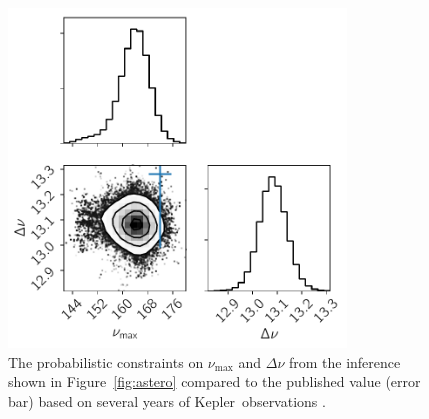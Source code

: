 \documentclass[manuscript, letterpaper]{aastex6}
\newcommand{\project}[1]{\textsf{#1}}
\newcommand{\kepler}{\project{Kepler}}
\newcommand{\figureref}[1]{\ref{fig:#1}}
\newcommand{\Figure}[1]{Figure~\figureref{#1}}
\newcommand{\figurelabel}[1]{\label{fig:#1}}
\begin{document}
\begin{figure}[!htbp]
\begin{center}
\includegraphics[width=0.8\textwidth]{figures/astero-11615890-numax_deltanu_corner.pdf}
\caption{The probabilistic constraints on $\nu_\mathrm{max}$ and $\Delta \nu$
    from the inference shown in \Figure{astero} compared to the published
    value (error bar) based on several years of \kepler\ observations
    \citep{Pinsonneault:2014}.
    \figurelabel{astero-corner}}
\end{center}
\end{figure}
\end{document}

